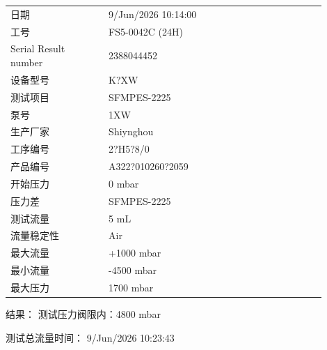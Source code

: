 \documentclass[UTF8,10pt,a4paper,fontset=fandol]{ctexart}
\newcommand{\fieldvalue}[1]{#1}
\begin{document}
\begin{tabular}{@{}p{0.28\linewidth}p{0.62\linewidth}@{}}
日期 &
\fieldvalue{9/Jun/2026 10:14:00}
\\
工号 &
\fieldvalue{FS5-0042C (24H)}
\\
Serial Result number &
\fieldvalue{2388044452}
\\
设备型号 &
\fieldvalue{K?XW}
\\
测试项目 &
\fieldvalue{SFMPES-2225}
\\
泵号 &
\fieldvalue{1XW}
\\
生产厂家 &
\fieldvalue{Shiynghou}
\\
工序编号 &
\fieldvalue{2?H5?8/0}
\\
产品编号 &
\fieldvalue{A322?010260?2059}
\\
开始压力 &
\fieldvalue{0 mbar}
\\
压力差 &
\fieldvalue{SFMPES-2225}
\\
测试流量 &
\fieldvalue{5 mL}
\\
流量稳定性 &
\fieldvalue{Air}
\\
最大流量 &
\fieldvalue{+1000 mbar}
\\
最小流量 &
\fieldvalue{-4500 mbar}
\\
最大压力 &
\fieldvalue{1700 mbar}
\end{tabular}

\vspace{1em}
\noindent
结果：\hspace{1em}
\fieldvalue{测试压力阀限内：4800 mbar}

\vspace{1em}
\noindent
测试总流量时间：\hspace{1em}
\fieldvalue{9/Jun/2026 10:23:43}
\end{document}
